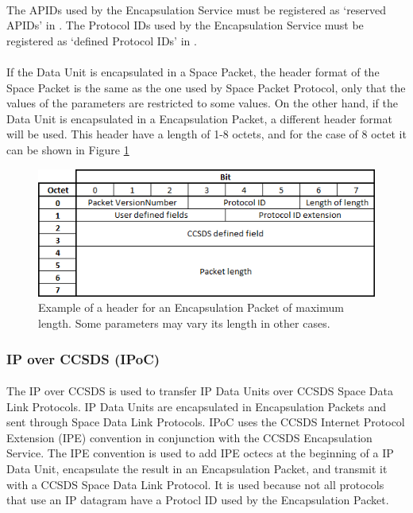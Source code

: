 \documentclass[12pt,a4paper]{report}
\begin{document}
\paragraph{}The APIDs used by the Encapsulation Service must be registered as ‘reserved APIDs’ in \cite{SANAAPID}. The Protocol IDs used by the Encapsulation Service must be registered as ‘defined Protocol IDs’ in \cite{SANAPID}.
\paragraph{}If the Data Unit is encapsulated in a Space Packet, the header format of the Space Packet is the same as the one used by Space Packet Protocol, only that the values of the parameters are restricted to some values. On the other hand, if the Data Unit is encapsulated in a Encapsulation Packet, a different header format will be used. This header have a length of 1-8 octets, and for the case of 8 octet it can be shown in Figure \ref{fig:ESheader}
\begin{figure}[H]
\begin{center}
\includegraphics[scale=1]{ES_header.PNG}
\caption[Encapsulation header]{Example of a header for an Encapsulation Packet of maximum length. Some parameters may vary its length in other cases.}
\label{fig:ESheader}
\end{center}
\end{figure}

\subsubsection{IP over CCSDS (IPoC)\cite{IPoC}}
\paragraph{}The IP over CCSDS is used to transfer IP Data Units over CCSDS Space Data Link Protocols. IP Data Units are encapsulated in Encapsulation Packets and sent through Space Data Link Protocols. IPoC uses the CCSDS Internet Protocol
Extension (IPE) convention in conjunction with the CCSDS Encapsulation Service. The IPE convention is used to add IPE octecs at the beginning of a IP Data Unit, encapsulate the result in an Encapsulation Packet, and transmit it with a CCSDS Space Data Link Protocol. It is used because not all protocols that use an IP datagram have a Protocl ID used by the Encapsulation Packet.
\end{document}
